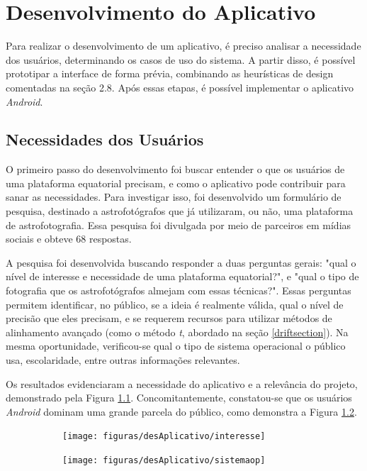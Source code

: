 \chapter{Desenvolvimento do Aplicativo}

Para realizar o desenvolvimento de um aplicativo, é preciso analisar a necessidade dos usuários, determinando os casos de uso do sistema. A partir disso, é possível prototipar a interface de forma prévia, combinando as heurísticas de design comentadas na seção 2.8. Após essas etapas, é possível implementar o aplicativo \textit{Android}.

\section{Necessidades dos Usuários}

O primeiro passo do desenvolvimento foi buscar entender o que os usuários de uma plataforma equatorial precisam, e como o aplicativo pode contribuir para sanar as necessidades. Para investigar isso, foi desenvolvido um formulário de pesquisa, destinado a astrofotógrafos que já utilizaram, ou não, uma plataforma de astrofotografia. Essa pesquisa foi divulgada por meio de parceiros em mídias sociais e obteve 68 respostas.

A pesquisa foi desenvolvida buscando responder a duas perguntas gerais: "qual o nível de interesse e necessidade de uma plataforma equatorial?", e "qual o tipo de fotografia que os astrofotógrafos almejam com essas técnicas?". Essas perguntas permitem identificar, no público, se a ideia é realmente válida, qual o nível de precisão que eles precisam, e se requerem recursos para utilizar métodos de alinhamento avançado (como o método \textit{t}, abordado na seção \ref{driftsection}). Na mesma oportunidade, verificou-se qual o tipo de sistema operacional o público usa, escolaridade, entre outras informações relevantes.
 
Os resultados evidenciaram a necessidade do aplicativo e a relevância do projeto, demonstrado pela Figura \ref{fig:resultadoapp}. Concomitantemente, constatou-se que os usuários \textit{Android} dominam uma grande parcela do público, como demonstra a Figura \ref{fig:usuariosandroid}. 


\begin{figure}[!htb]
	\centering
	\captionsetup[subfigure]{justification=centering}
	\caption{Resultados do Formulário de Pesquisa com Usuários. (a) Interesse dos astrofotógrafos no aplicativo. (b) Sistema operacional usado}
	\begin{subfigure}[b]{0.58\textwidth}
		\centering
		\texttt{[image: figuras/desAplicativo/interesse]}
		\caption{}
		\label{fig:resultadoapp}
	\end{subfigure}
	\hfill
	\begin{subfigure}[b]{0.41\textwidth}
		\centering
		\texttt{[image: figuras/desAplicativo/sistemaop]}
		\caption{}
		\label{fig:usuariosandroid}
	\end{subfigure}
	\label{fig:resultadosforms}
\end{figure}

